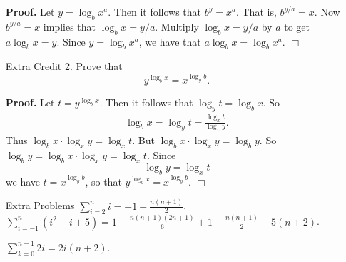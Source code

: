 \documentclass[9pt]{article}
\newcommand{\qed}{\hfill \ensuremath{\Box}}
\newcommand{\D}{\displaystyle}
\begin{document}
\begin{enumerate}
   \textbf{Proof.} Let $y =\log_bx^a$. Then it follows that $b^y = x^a$. That
   is, $b^{y/a} = x$. Now $b^{y/a} = x$ implies that $\log_bx = y/a$. Multiply
   $\log_bx = y/a$ by $a$ to get $a\log_bx = y$. Since $y = \log_bx^a$, we have
   that $a\log_bx = \log_bx^a$. \qed
\item[Extra Credit 2.] Prove that 
   $$y^{\log_bx} =x^{\log_yb}.$$
   
   \textbf{Proof.} Let $t = y^{\log_bx}$. Then it follows that
   $\log_yt = \log_bx$. So
   \begin{align*}
      \log_bx = \log_yt = \frac{\log_xt}{\log_xy}.
   \end{align*}
   Thus
   $\log_bx \cdot \log_xy = \log_xt$. But $\log_bx \cdot \log_xy = \log_by$. So
   $\log_by = \log_bx\cdot\log_xy = \log_xt$. Since 
   $$\log_by = \log_xt$$
   we have $t = x^{\log_yb}$, so that $y^{\log_bx} = x^{\log_yb}$. \qed
\item[Extra Problems]
   $\D\sum_{i=2}^ni = -1 + \frac{n(n+1)}{2}$. \\
   $\D\sum_{i=-1}^n(i^2-i+5) = 1 + \frac{n(n+1)(2n+1)}{6} + 1 - \frac{n(n+1)}{2} + 5(n+2)$.
   
   $\D\sum_{k=0}^{n+1}2i = 2i(n+2)$.
      
\end{enumerate}
\end{document}
